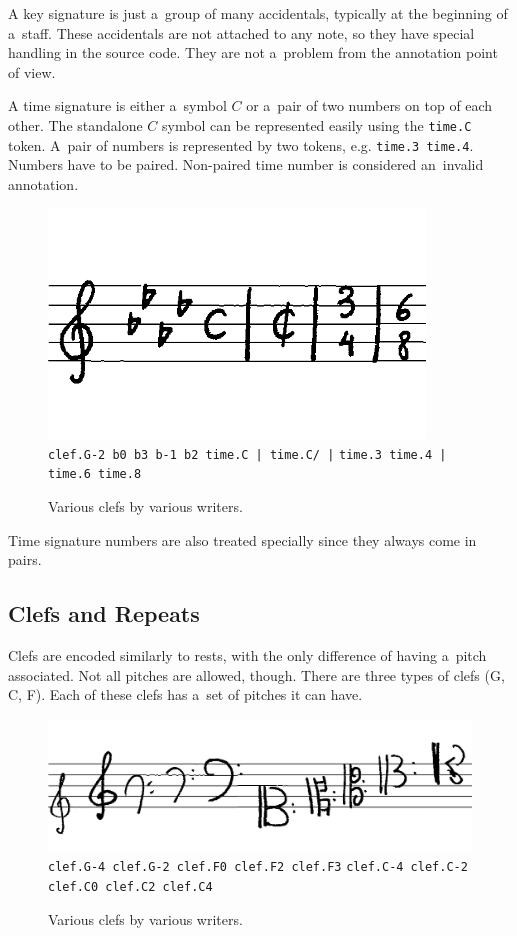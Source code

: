 A key signature is just a~group of many accidentals, typically at the beginning of a~staff. These accidentals are not attached to any note, so they have special handling in the source code. They are not a~problem from the annotation point of view.

A time signature is either a~symbol $C$ or a~pair of two numbers on top of each other. The standalone $C$ symbol can be represented easily using the \verb`time.C` token. A~pair of numbers is represented by two tokens, e.g. \verb`time.3 time.4`. Numbers have to be paired. Non-paired time number is considered an~invalid annotation.

\begin{figure}[h]
    \centering
    \includegraphics[width=100mm]{../img/key-and-time-signatures}
    \verb`clef.G-2 b0 b3 b-1 b2 time.C | time.C/ |`
    \verb`time.3 time.4 | time.6 time.8`
    \caption{Various clefs by various writers.}
    \label{fig4:KeyAndTimeSignatures}
\end{figure}

Time signature numbers are also treated specially since they always come in pairs.


\subsection{Clefs and Repeats}

Clefs are encoded similarly to rests, with the only difference of having a~pitch associated. Not all pitches are allowed, though. There are three types of clefs (G, C, F). Each of these clefs has a~set of pitches it can have.

\begin{figure}[h]
    \centering
    \includegraphics[width=120mm]{../img/clefs}
    \verb`clef.G-4 clef.G-2 clef.F0 clef.F2 clef.F3`
    \verb`clef.C-4 clef.C-2 clef.C0 clef.C2 clef.C4`
    \caption{Various clefs by various writers.}
    \label{fig4:Clefs}
\end{figure}

